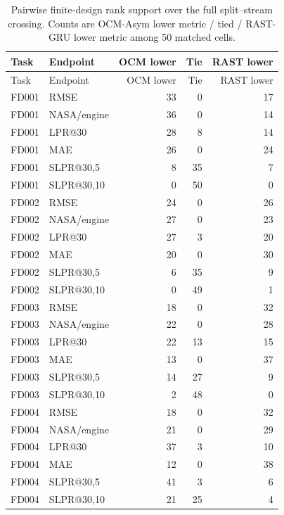 \begin{longtable}{@{}llrrr@{}}
\caption{Pairwise finite-design rank support over the full split--stream crossing. Counts are OCM-Asym lower metric / tied / RAST-GRU lower metric among 50 matched cells.}\label{tab:supp-full-rank-support}\\
\toprule Task & Endpoint & OCM lower & Tie & RAST lower \\
\midrule
\endfirsthead
\toprule Task & Endpoint & OCM lower & Tie & RAST lower \\
\midrule
\endhead
FD001 & RMSE & 33 & 0 & 17 \\
FD001 & NASA/engine & 36 & 0 & 14 \\
FD001 & LPR@30 & 28 & 8 & 14 \\
FD001 & MAE & 26 & 0 & 24 \\
FD001 & SLPR@30,5 & 8 & 35 & 7 \\
FD001 & SLPR@30,10 & 0 & 50 & 0 \\
FD002 & RMSE & 24 & 0 & 26 \\
FD002 & NASA/engine & 27 & 0 & 23 \\
FD002 & LPR@30 & 27 & 3 & 20 \\
FD002 & MAE & 20 & 0 & 30 \\
FD002 & SLPR@30,5 & 6 & 35 & 9 \\
FD002 & SLPR@30,10 & 0 & 49 & 1 \\
FD003 & RMSE & 18 & 0 & 32 \\
FD003 & NASA/engine & 22 & 0 & 28 \\
FD003 & LPR@30 & 22 & 13 & 15 \\
FD003 & MAE & 13 & 0 & 37 \\
FD003 & SLPR@30,5 & 14 & 27 & 9 \\
FD003 & SLPR@30,10 & 2 & 48 & 0 \\
FD004 & RMSE & 18 & 0 & 32 \\
FD004 & NASA/engine & 21 & 0 & 29 \\
FD004 & LPR@30 & 37 & 3 & 10 \\
FD004 & MAE & 12 & 0 & 38 \\
FD004 & SLPR@30,5 & 41 & 3 & 6 \\
FD004 & SLPR@30,10 & 21 & 25 & 4 \\
\bottomrule
\end{longtable}
